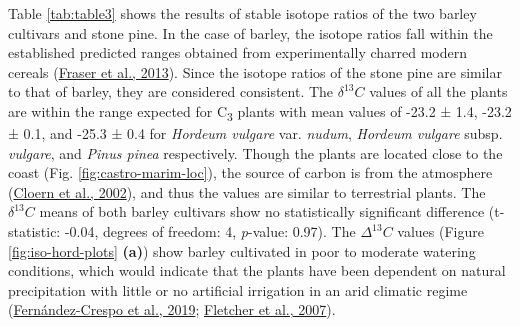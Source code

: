 \documentclass[3p]{elsarticle} %
\begin{document}
Table \ref{tab:table3} shows the results of stable isotope ratios of the two barley cultivars and stone pine. In the case of barley, the isotope ratios fall within the established predicted ranges obtained from experimentally charred modern cereals (\protect\hyperlink{ref-fraser_etal13a}{Fraser et al., 2013}). Since the isotope ratios of the stone pine are similar to that of barley, they are considered consistent. The \(\delta ^{13}C\) values of all the plants are within the range expected for C\textsubscript{3} plants with mean values of -23.2 ± 1.4\text{\textperthousand}, -23.2 ± 0.1\text{\textperthousand}, and -25.3 ± 0.4\text{\textperthousand} for \emph{Hordeum vulgare} var. \emph{nudum}, \emph{Hordeum vulgare} subsp. \emph{vulgare}, and \emph{Pinus pinea} respectively. Though the plants are located close to the coast (Fig. \ref{fig:castro-marim-loc}), the source of carbon is from the atmosphere (\protect\hyperlink{ref-cloern_etal02}{Cloern et al., 2002}), and thus the values are similar to terrestrial plants. The \(\delta ^{13}C\) means of both barley cultivars show no statistically significant difference (t-statistic: -0.04, degrees of freedom: 4, \emph{p}-value: 0.97). The \(\Delta ^{13}C\) values (Figure \ref{fig:iso-hord-plots} \textbf{(a)}) show barley cultivated in poor to moderate watering conditions, which would indicate that the plants have been dependent on natural precipitation with little or no artificial irrigation in an arid climatic regime (\protect\hyperlink{ref-fernandez-crespo_etal19}{Fernández-Crespo et al., 2019}; \protect\hyperlink{ref-fletcher_etal07}{Fletcher et al., 2007}).
\end{document}
